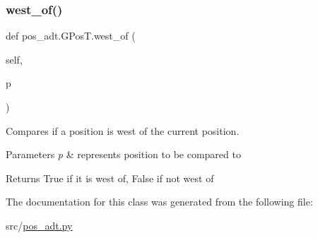 \subsubsection{\texorpdfstring{west\+\_\+of()}{west\_of()}}
{\footnotesize\ttfamily def pos\+\_\+adt.\+G\+Pos\+T.\+west\+\_\+of (\begin{DoxyParamCaption}\item[{}]{self,  }\item[{}]{p }\end{DoxyParamCaption})}



Compares if a position is west of the current position. 


\begin{DoxyParams}{Parameters}
{\em p} & represents position to be compared to \\
\hline
\end{DoxyParams}
\begin{DoxyReturn}{Returns}
True if it is west of, False if not west of 
\end{DoxyReturn}


The documentation for this class was generated from the following file\+:\begin{DoxyCompactItemize}
\item 
src/\hyperlink{pos__adt_8py}{pos\+\_\+adt.\+py}\end{DoxyCompactItemize}

